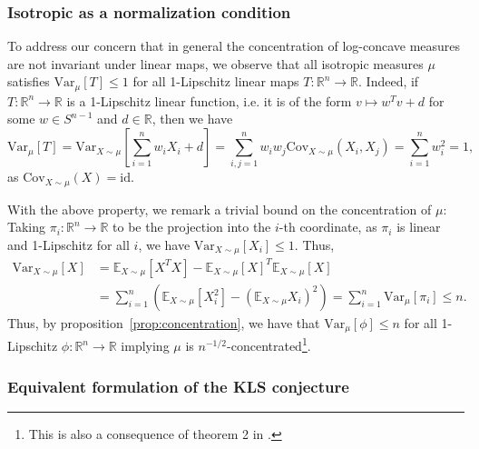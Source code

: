 \subsubsection{Isotropic as a normalization condition}

To address our concern that in general the concentration of log-concave measures are not invariant under linear maps, 
we observe that all isotropic measures \(\mu\) satisfies \(\text{Var}_\mu[T] \le 1\) for all 1-Lipschitz linear maps 
\(T : \mathbb{R}^n \to \mathbb{R}\). Indeed, if 
\(T : \mathbb{R}^n \to \mathbb{R}\) is a 1-Lipschitz linear function, i.e. it is of the form \(v \mapsto w^T v + d\) 
for some \(w \in S^{n - 1}\) and \(d \in \mathbb{R}\), then we have
\[\text{Var}_{\mu}[T] = \text{Var}_{X \sim \mu}\left[\sum_{i = 1}^n w_i X_i + d\right] 
    = \sum_{i, j = 1}^n w_i w_j \text{Cov}_{X \sim \mu}(X_i, X_j) = \sum_{i = 1}^n w_i^2 = 1,\]
as \(\text{Cov}_{X \sim \mu}(X) = \text{id}\). 

With the above property, we remark a trivial bound on the concentration of \(\mu\):
Taking \(\pi_i : \mathbb{R}^n \to \mathbb{R}\) to be the projection into the \(i\)-th coordinate, 
as \(\pi_i\) is linear and 1-Lipschitz for all \(i\), we have \(\text{Var}_{X \sim \mu}[X_i] \le 1\).
Thus, 
\begin{align*}
  \text{Var}_{X \sim \mu}[X] & = \mathbb{E}_{X \sim \mu}[X^T X] - \mathbb{E}_{X \sim \mu}[X]^T \mathbb{E}_{X \sim \mu}[X]\\ 
    & = \sum_{i = 1}^n (\mathbb{E}_{X \sim \mu}[X_i^2] - (\mathbb{E}_{X \sim \mu}X_i)^2)
      = \sum_{i = 1}^n \text{Var}_\mu[\pi_i] \le n.
\end{align*}
Thus, by proposition~\ref{prop:concentration}, we have that \(\text{Var}_\mu[\phi] \le n\) for all 
1-Lipschitz \(\phi : \mathbb{R}^n \to \mathbb{R}\) implying \(\mu\) is \(n^{-1/2}\)-concentrated\footnote{This is also a consequence of theorem 2 in \cite{Lee_2016}.}.


\subsubsection{Equivalent formulation of the KLS conjecture}

